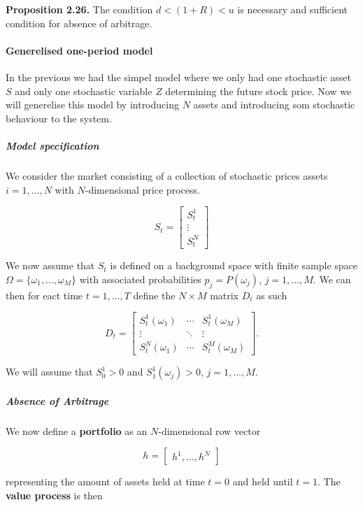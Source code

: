 \documentclass[
]{article}
\begin{document}
\textbf{Proposition 2.26.} The condition \(d<(1+R)<u\) is necessary and
sufficient condition for absence of arbitrage.

\hypertarget{generelised-one-period-model}{%
\paragraph{Generelised one-period
model}\label{generelised-one-period-model}}

In the previous we had the simpel model where we only had one stochastic
asset \(S\) and only one stochastic variable \(Z\) determining the
future stock price. Now we will generelise this model by introducing
\(N\) assets and introducing som stochastic behaviour to the system.

\hypertarget{model-specification}{%
\subparagraph{Model specification}\label{model-specification}}

We consider the market consisting of a collection of stochastic prices
assets \(i=1,...,N\) with \(N\)-dimensional price process.

\[
S_t=\begin{bmatrix} S_t^1\\
\vdots\\
S_t^N\end{bmatrix}
\]

We now assume that \(S_t\) is defined on a background space with finite
sample space \(\Omega = \{\omega_1,...,\omega_M\}\) with associated
probabilities \(p_j=P(\omega_j)\), \(j=1,...,M\). We can then for eact
time \(t=1,...,T\) define the \(N\times M\) matrix \(D_t\) as such

\[
D_t=\begin{bmatrix} S_t^1(\omega_1)&\cdots &S_t^1(\omega_M)\\
\vdots &\ddots & \vdots\\
S_t^N(\omega_1) &\cdots&S_t^M(\omega_M)\end{bmatrix}.
\]

We will assume that \(S_0^1>0\) and \(S_1^1(\omega_j)>0\),
\(j=1,...,M\).

\hypertarget{absence-of-arbitrage}{%
\subparagraph{Absence of Arbitrage}\label{absence-of-arbitrage}}

We now define a \textbf{portfolio} as an \(N\)-dimensional row vector

\[
h=\begin{bmatrix} h^1, \dots,h^N\end{bmatrix}
\]

representing the amount of assets held at time \(t=0\) and held until
\(t=1\). The \textbf{value process} is then
\end{document}
